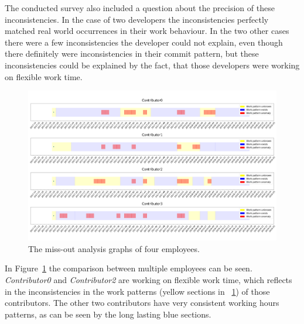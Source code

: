The conducted survey also included a question about the precision of these inconsistencies.
In the case of two developers the inconsistencies perfectly matched real world occurrences in their work behaviour.
In the two other cases there were a few inconsistencies the developer could not explain, even though there definitely were inconsistencies in their commit pattern, but these inconsistencies could be explained by the fact, that those developers were working on flexible work time.

\begin{figure}[H]
    \includegraphics[scale=0.20]{./graphs/analysis/work-time-analysis-comparison}
    \centering
    \caption{The miss-out analysis graphs of four employees.}\label{fig:miss-out-comparison}
\end{figure}

In Figure~\ref{fig:miss-out-comparison} the comparison between multiple employees can be seen.
\emph{Contributor0} and \emph{Contributor2} are working on flexible work time, which reflects in the inconsistencies in the work patterns (yellow sections in ~\ref{fig:miss-out-comparison}) of those contributors.
The other two contributors have very consistent working hours patterns, as can be seen by the long lasting blue sections.
